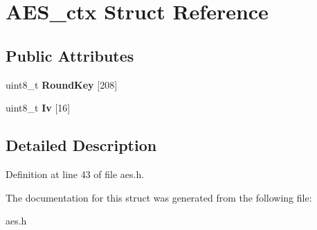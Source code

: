 \hypertarget{struct_a_e_s__ctx}{}\section{A\+E\+S\+\_\+ctx Struct Reference}
\label{struct_a_e_s__ctx}
\subsection*{Public Attributes}
\begin{DoxyCompactItemize}
\item 
\mbox{\label{struct_a_e_s__ctx_ab7d0b2d3094b0f0e0c09edaddf144989}} 
uint8\+\_\+t {\bfseries Round\+Key} \mbox{[}208\mbox{]}
\item 
\mbox{\label{struct_a_e_s__ctx_ac8d95ced9101a2f452d7fca22eff0cf1}} 
uint8\+\_\+t {\bfseries Iv} \mbox{[}16\mbox{]}
\end{DoxyCompactItemize}


\subsection{Detailed Description}


Definition at line 43 of file aes.\+h.



The documentation for this struct was generated from the following file\+:\begin{DoxyCompactItemize}
\item 
aes.\+h\end{DoxyCompactItemize}
